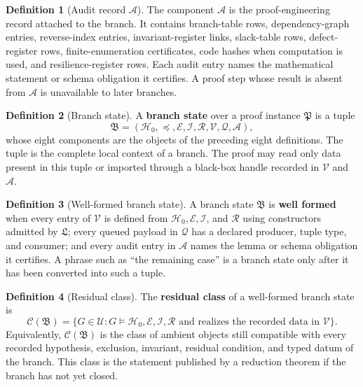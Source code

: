 \documentclass[
  11pt,
]{article}
\theoremstyle{definition}
\newtheorem{definition}{Definition}[section]
\begin{document}
\begin{definition}[Audit record \(\mathcal A\)]\label{def:audit-record}
The component \(\mathcal A\) is the proof-engineering record attached to
the branch.  It contains branch-table rows, dependency-graph entries,
reverse-index entries, invariant-register links, slack-table rows,
defect-register rows, finite-enumeration certificates, code hashes when
computation is used, and resilience-register rows.  Each audit entry
names the mathematical statement or schema obligation it certifies.  A
proof step whose result is absent from \(\mathcal A\) is unavailable to
later branches.
\end{definition}

\begin{definition}[Branch state]\label{def:branch-state}
A \textbf{branch state} over a proof instance \(\mathfrak P\) is a tuple
\[
\mathfrak B
=
(\mathcal H_0,\preceq,\mathcal E,\mathcal I,\mathcal R,
 \mathcal V,\mathcal Q,\mathcal A),
\]
whose eight components are the objects of
the preceding eight definitions.
The tuple is the complete local context of a branch.  The proof may read
only data present in this tuple or imported through a black-box handle
recorded in \(\mathcal V\) and \(\mathcal A\).
\end{definition}

\begin{definition}[Well-formed branch state]\label{def:well-formed-branch-state}
A branch state \(\mathfrak B\) is \textbf{well formed} when every entry
of \(\mathcal V\) is defined from \(\mathcal H_0,\mathcal E,\mathcal I\),
and \(\mathcal R\) using constructors admitted by \(\mathfrak L\); every
queued payload in \(\mathcal Q\) has a declared producer, tuple type, and
consumer; and every audit entry in \(\mathcal A\) names the lemma or
schema obligation it certifies.  A phrase such as ``the remaining case''
is a branch state only after it has been converted into such a tuple.
\end{definition}

\begin{definition}[Residual class]\label{def:residual-class}
The \textbf{residual class} of a well-formed branch state is
\[
\mathcal C(\mathfrak B)
=
\{G\in\mathcal U:
  G\models \mathcal H_0,\mathcal E,\mathcal I,\mathcal R
  \text{ and realizes the recorded data in }\mathcal V\}.
\]
Equivalently, \(\mathcal C(\mathfrak B)\) is the class of ambient
objects still compatible with every recorded hypothesis, exclusion,
invariant, residual condition, and typed datum of the branch.  This class
is the statement published by a reduction theorem if the branch has not
yet closed.
\end{definition}
\end{document}
